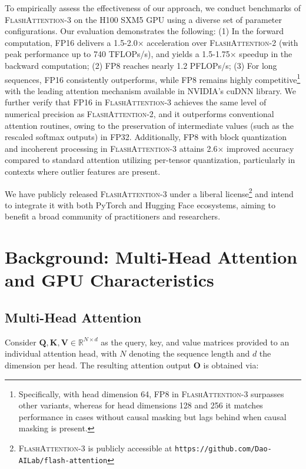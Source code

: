 To empirically assess the effectiveness of our approach, we conduct benchmarks of \textsc{FlashAttention-3} on the H100 SXM5 GPU using a diverse set of parameter configurations. Our evaluation demonstrates the following: (1) In the forward computation, FP16 delivers a 1.5-2.0$\times$ acceleration over \textsc{FlashAttention-2} (with peak performance up to 740 TFLOPs/s), and yields a 1.5-1.75$\times$ speedup in the backward computation; (2) FP8 reaches nearly 1.2 PFLOPs/s; (3) For long sequences, FP16 consistently outperforms, while FP8 remains highly competitive\footnote{Specifically, with head dimension 64, FP8 in \textsc{FlashAttention-3} surpasses other variants, whereas for head dimensions 128 and 256 it matches performance in cases without causal masking but lags behind when causal masking is present.} with the leading attention mechanism available in NVIDIA's cuDNN library. We further verify that FP16 in \textsc{FlashAttention-3} achieves the same level of numerical precision as \textsc{FlashAttention-2}, and it outperforms conventional attention routines, owing to the preservation of intermediate values (such as the rescaled softmax outputs) in FP32. Additionally, FP8 with block quantization and incoherent processing in \textsc{FlashAttention-3} attains 2.6$\times$ improved accuracy compared to standard attention utilizing per-tensor quantization, particularly in contexts where outlier features are present.

We have publicly released \textsc{FlashAttention-3} under a liberal license\footnote{\textsc{FlashAttention-3} is publicly accessible at \texttt{https://github.com/Dao-AILab/flash-attention}} and intend to integrate it with both PyTorch and Hugging Face ecosystems, aiming to benefit a broad community of practitioners and researchers.

\section{Background: Multi-Head Attention and GPU Characteristics}
\label{sec:background}

\subsection{Multi-Head Attention}
\label{subsec:multi_head_attn}

Consider $\mathbf{Q}, \mathbf{K}, \mathbf{V} \in \mathbb{R}^{N \times d}$ as the query, key, and value matrices provided to an individual attention head, with $N$ denoting the sequence length and $d$ the dimension per head. The resulting attention output $\mathbf{O}$ is obtained via:

